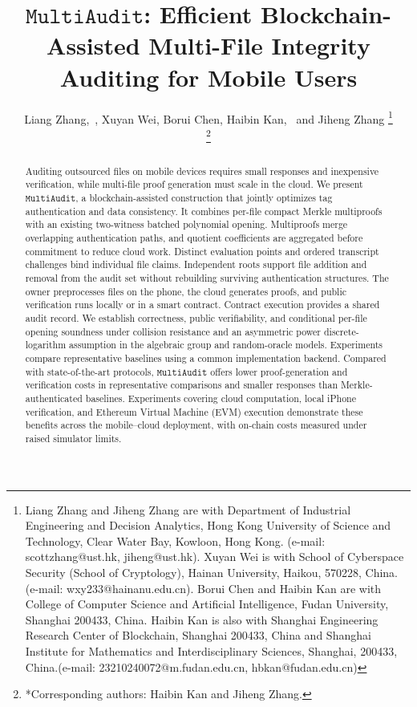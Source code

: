\documentclass[lettersize,journal]{IEEEtran}
\newcommand{\MultiAudit}{\ensuremath{\mathtt{MultiAudit}}}
\begin{document}
\title{\MultiAudit{}: Efficient Blockchain-Assisted Multi-File Integrity Auditing for Mobile Users}

\author{Liang Zhang,~, Xuyan Wei, Borui Chen, Haibin Kan,~ and Jiheng Zhang
\thanks{Liang Zhang and Jiheng Zhang are with Department of Industrial Engineering and Decision Analytics, Hong Kong University of Science and Technology, Clear Water Bay, Kowloon, Hong Kong. (e-mail: scottzhang@ust.hk, jiheng@ust.hk). Xuyan Wei is with School of Cyberspace Security (School of Cryptology), Hainan University, Haikou, 570228, China. (e-mail: wxy233@hainanu.edu.cn). Borui Chen and Haibin Kan are with College of Computer Science and Artificial Intelligence, Fudan University, Shanghai 200433, China. Haibin Kan is also with Shanghai Engineering Research Center of Blockchain, Shanghai 200433, China and Shanghai Institute for Mathematics and Interdisciplinary Sciences, Shanghai, 200433, China.(e-mail: 23210240072@m.fudan.edu.cn, hbkan@fudan.edu.cn)}

\thanks{*Corresponding authors: Haibin Kan and Jiheng Zhang.}
}

\maketitle
\begin{abstract}
Auditing outsourced files on mobile devices requires small responses and inexpensive verification, while multi-file proof generation must scale in the cloud. We present $\mathtt{\MultiAudit{}}$, a blockchain-assisted construction that jointly optimizes tag authentication and data consistency. It combines per-file compact Merkle multiproofs with an existing two-witness batched polynomial opening. Multiproofs merge overlapping authentication paths, and quotient coefficients are aggregated before commitment to reduce cloud work. Distinct evaluation points and ordered transcript challenges bind individual file claims. Independent roots support file addition and removal from the audit set without rebuilding surviving authentication structures. The owner preprocesses files on the phone, the cloud generates proofs, and public verification runs locally or in a smart contract. Contract execution provides a shared audit record. We establish correctness, public verifiability, and conditional per-file opening soundness under collision resistance and an asymmetric power discrete-logarithm assumption in the algebraic group and random-oracle models. Experiments compare representative baselines using a common implementation backend. Compared with state-of-the-art protocols, \MultiAudit{} offers lower proof-generation and verification costs in representative comparisons and smaller responses than Merkle-authenticated baselines. Experiments covering cloud computation, local iPhone verification, and Ethereum Virtual Machine (EVM) execution demonstrate these benefits across the mobile--cloud deployment, with on-chain costs measured under raised simulator limits.
\end{abstract}
\end{document}
